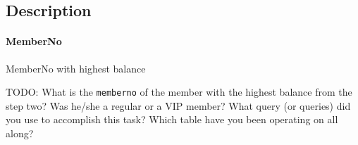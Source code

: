 \documentclass{scrartcl}
\newcommand\solution[2]{{\paragraph{#1}#2}}
\newcommand\todo[1]{TODO: #1}
\begin{document}
\subsection*{Description}
\solution{MemberNo}{MemberNo with highest balance}

\todo{What is the \texttt{memberno} of the member with the highest balance from the step two? Was he/she a regular or a VIP member? What query (or queries) did you use to accomplish this task? Which table have you been operating on all along?} \\
\end{document}
